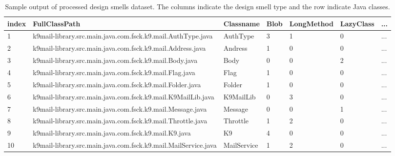 \documentclass[AMA,Times1COL]{WileyNJDv5} %
\begin{document}
		\begin{table}
		\centering %
		\caption{Sample output of processed design smells dataset. The columns indicate the design smell type and the row indicate Java classes.} %
			\begin{tabular*}{\textwidth}{@{\extracolsep\fill}lllllll@{\extracolsep\fill}}%
			
			\toprule
			\textbf{index}& \textbf{FullClassPath} & \textbf{Classname} & \textbf{Blob} &\textbf{LongMethod} &\textbf{ LazyClass} & \textbf{...}  \\ 
			\midrule %
			1 & k9mail-library.src.main.java.com.fsck.k9.mail.AuthType.java & AuthType & 3 & 1 &  0 & ... \\ %
			2 & k9mail-library.src.main.java.com.fsck.k9.mail.Address.java & Andress & 1 & 0 & 0 & ...  \\
			3 & k9mail-library.src.main.java.com.fsck.k9.mail.Body.java & Body & 0 & 0 & 2 &  ... \\
			4 &k9mail-library.src.main.java.com.fsck.k9.mail.Flag.java & Flag & 1 & 0 & 0 & ... \\ 
			5 & k9mail-library.src.main.java.com.fsck.k9.mail.Folder.java & Folder & 1 & 0 & 0 & ... \\
			6 &k9mail-library.src.main.java.com.fsck.k9.mail.K9MailLib.java & K9MailLib & 0 & 3 & 0 & ... \\
			7 & k9mail-library.src.main.java.com.fsck.k9.mail.Message.java & Message & 0 & 0 & 1 & ... \\
			8 &k9mail-library.src.main.java.com.fsck.k9.mail.Throttle.java & Throttle & 1 & 2 &0 &  ...  \\
			9 & k9mail-library.src.main.java.com.fsck.k9.mail.K9.java & K9 & 4 & 0 & 0 & ... \\ 
			10 & k9mail-library.src.main.java.com.fsck.k9.mail.MailService.java & MailService & 1 & 2 & 0 & ... \\  %
			\bottomrule
		\end{tabular*}
		\label{table:ds_processed} %
	\end{table}
	
\end{document}
